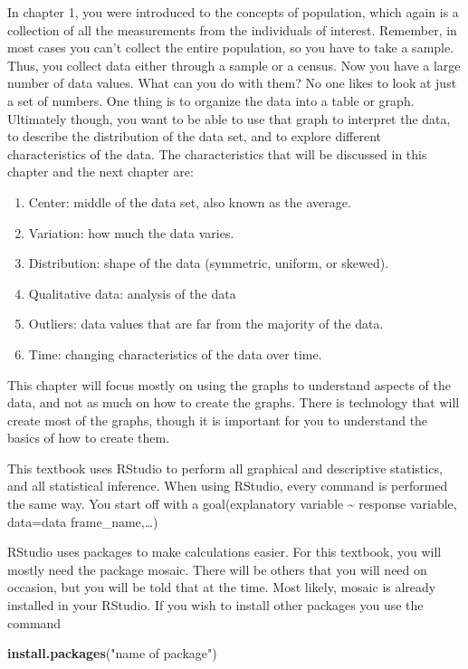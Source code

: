 \documentclass[
]{book}
\newenvironment{Shaded}{\begin{snugshade}}{\end{snugshade}}
\newcommand{\KeywordTok}[1]{\textcolor[rgb]{0.13,0.29,0.53}{\textbf{#1}}}
\newcommand{\NormalTok}[1]{#1}
\newcommand{\StringTok}[1]{\textcolor[rgb]{0.31,0.60,0.02}{#1}}
\providecommand{\tightlist}{%
  \setlength{\itemsep}{0pt}\setlength{\parskip}{0pt}}
\begin{document}
In chapter 1, you were introduced to the concepts of population, which again is a collection of all the measurements from the individuals of interest. Remember, in most cases you can't collect the entire
population, so you have to take a sample. Thus, you collect data either through a sample or a census. Now you have a large number of data values. What can you do with them? No one likes to look at just a set of numbers. One thing is to organize the data into a table or graph. Ultimately though, you want to be able to use that graph to interpret the data, to describe the distribution of the data set, and to explore different characteristics of the data. The characteristics that will be discussed in this chapter and the next chapter are:

\begin{enumerate}
\def\labelenumi{\arabic{enumi}.}
\tightlist
\item
  Center: middle of the data set, also known as the average.
\item
  Variation: how much the data varies.
\item
  Distribution: shape of the data (symmetric, uniform, or skewed).
\item
  Qualitative data: analysis of the data
\item
  Outliers: data values that are far from the majority of the data.
\item
  Time: changing characteristics of the data over time.
\end{enumerate}

This chapter will focus mostly on using the graphs to understand aspects of the data, and not as much on how to create the graphs. There is technology that will create most of the graphs, though it is important for you to understand the basics of how to create them.

This textbook uses RStudio to perform all graphical and descriptive statistics, and all statistical inference. When using RStudio, every command is performed the same way. You start off with a
goal(explanatory variable \textasciitilde{} response variable, data=data frame\_name,\ldots)

RStudio uses packages to make calculations easier. For this textbook, you will mostly need the package mosaic. There will be others that you will need on occasion, but you will be told that at the time. Most likely, mosaic is already installed in your RStudio. If you wish to install other packages you use the command

\begin{Shaded}
\begin{Highlighting}[]
\KeywordTok{install.packages}\NormalTok{(}\StringTok{"name of package"}\NormalTok{)}
\end{Highlighting}
\end{Shaded}
\end{document}
